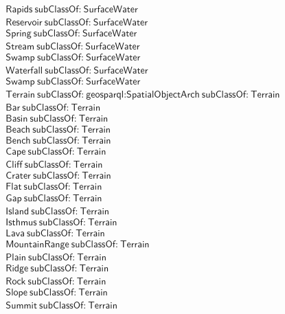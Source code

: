\begin{align}
  \textsf{Rapids}~\textsf{subClassOf:}~\textsf{SurfaceWater}\\
  \textsf{Reservoir}~\textsf{subClassOf:}~\textsf{SurfaceWater}\\
  \textsf{Spring}~\textsf{subClassOf:}~\textsf{SurfaceWater}\\
  \textsf{Stream}~\textsf{subClassOf:}~\textsf{SurfaceWater}\\
  \textsf{Swamp}~\textsf{subClassOf:}~\textsf{SurfaceWater}\\
  \textsf{Waterfall}~\textsf{subClassOf:}~\textsf{SurfaceWater}\\
  \textsf{Swamp}~\textsf{subClassOf:}~\textsf{SurfaceWater}\\
  \textsf{Terrain}~\textsf{subClassOf:}~\textsf{geosparql:SpatialObject}  \textsf{Arch}~\textsf{subClassOf:}~\textsf{Terrain}\\
  \textsf{Bar}~\textsf{subClassOf:}~\textsf{Terrain}\\
  \textsf{Basin}~\textsf{subClassOf:}~\textsf{Terrain}\\
  \textsf{Beach}~\textsf{subClassOf:}~\textsf{Terrain}\\
  \textsf{Bench}~\textsf{subClassOf:}~\textsf{Terrain}\\
  \textsf{Cape}~\textsf{subClassOf:}~\textsf{Terrain}\\
  \textsf{Cliff}~\textsf{subClassOf:}~\textsf{Terrain}\\
  \textsf{Crater}~\textsf{subClassOf:}~\textsf{Terrain}\\
  \textsf{Flat}~\textsf{subClassOf:}~\textsf{Terrain}\\
  \textsf{Gap}~\textsf{subClassOf:}~\textsf{Terrain}\\
  \textsf{Island}~\textsf{subClassOf:}~\textsf{Terrain}\\
  \textsf{Isthmus}~\textsf{subClassOf:}~\textsf{Terrain}\\
  \textsf{Lava}~\textsf{subClassOf:}~\textsf{Terrain}\\
  \textsf{MountainRange}~\textsf{subClassOf:}~\textsf{Terrain}\\
  \textsf{Plain}~\textsf{subClassOf:}~\textsf{Terrain}\\
  \textsf{Ridge}~\textsf{subClassOf:}~\textsf{Terrain}\\
  \textsf{Rock}~\textsf{subClassOf:}~\textsf{Terrain}\\
  \textsf{Slope}~\textsf{subClassOf:}~\textsf{Terrain}\\
  \textsf{Summit}~\textsf{subClassOf:}~\textsf{Terrain}\\

\end{align}
